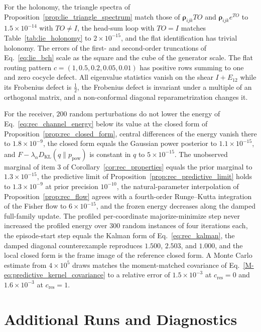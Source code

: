 \documentclass[twoside,11pt]{article}
\begin{document}
For the holonomy, the triangle spectra of Proposition~\ref{prop:lie_triangle_spectrum} match those of $\boldsymbol\rho_{ijk}TO$ and $\boldsymbol\rho_{ijk}e^{TO}$ to $1.5\times10^{-14}$ with $TO\ne I$, the head-sum loop with $TO=I$ matches Table~\ref{tab:lie_holonomy} to $2\times10^{-15}$, and the flat identification has trivial holonomy. The errors of the first- and second-order truncations of Eq.~\eqref{eq:lie_bch} scale as the square and the cube of the generator scale. The flat routing pattern $c=(1,0.5,0.2,0.05,0.01)$ has positive rows summing to one and zero cocycle defect. All eigenvalue statistics vanish on the shear $I+E_{12}$ while its Frobenius defect is $\tfrac12$, the Frobenius defect is invariant under a multiple of an orthogonal matrix, and a non-conformal diagonal reparametrization changes it.

For the receiver, $200$ random perturbations do not lower the energy of Eq.~\eqref{eq:rec_channel_energy} below its value at the closed form of Proposition~\ref{prop:rec_closed_form}, central differences of the energy vanish there to $1.8\times10^{-9}$, the closed form equals the Gaussian power posterior to $1.1\times10^{-15}$, and $F-\lambda_\alpha D_{\mathrm{KL}}(q\|p_{\mathrm{pow}})$ is constant in $q$ to $5\times10^{-15}$. The unobserved marginal of item 3 of Corollary~\ref{cor:rec_properties} equals the prior marginal to $1.3\times10^{-15}$, the predictive limit of Proposition~\ref{prop:rec_predictive_limit} holds to $1.3\times10^{-9}$ at prior precision $10^{-10}$, the natural-parameter interpolation of Proposition~\ref{prop:rec_flow} agrees with a fourth-order Runge--Kutta integration of the Fisher flow to $6\times10^{-15}$, and the frozen energy decreases along the damped full-family update. The profiled per-coordinate majorize-minimize step never increased the profiled energy over $300$ random instances of four iterations each, the episode-start step equals the Kalman form of Eq.~\eqref{eq:rec_kalman}, the damped diagonal counterexample reproduces $1.500$, $2.503$, and $1.000$, and the local closed form is the frame image of the reference closed form. A Monte Carlo estimate from $4\times10^5$ draws matches the moment-matched covariance of Eq.~\eqref{M-eq:predictive_kernel_covariance} to a relative error of $1.5\times10^{-3}$ at $c_{\mathrm{res}}=0$ and $1.6\times10^{-3}$ at $c_{\mathrm{res}}=1$.

\section{Additional Runs and Diagnostics}
\label{supp:runs}
\end{document}

